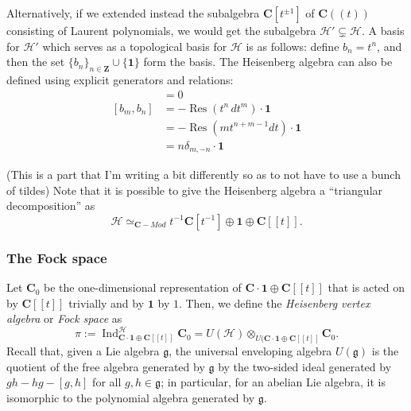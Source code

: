 \documentclass{article}
\newcommand{\CC}{\mathbold{C}}
\newcommand{\ZZ}{\mathbold{Z}}
\newcommand{\Hh}{\mathcal{H}}
\newcommand{\one}{\mathbold{1}}
\newcommand{\gf}{\mathfrak{g}}
\DeclareMathOperator{\Res}{Res}
\DeclareMathOperator{\Ind}{Ind}
\begin{document}
Alternatively, if we extended instead the subalgebra $\CC[t^{\pm 1}]$ of $\CC((t))$ consisting of Laurent polynomials, we would get the subalgebra $\Hh' \subsetneq \Hh$.  A basis for $\Hh'$ which serves as a topological basis for $\Hh$ is as follows: define $b_n=t^n$, and then the set $\{b_n\}_{n \in \ZZ} \cup \{\one\}$ form the basis.  The Heisenberg algebra can also be defined using explicit generators and relations:
\begin{align}
  [b_n,\one]&=0\\
  [b_m,b_n]&=-\Res(t^n\,dt^m)\cdot\one\\
  &=-\Res(mt^{n+m-1}dt)\cdot\one\\
  &=n\delta_{m,-n}\cdot\one
\end{align}

(This is a part that I'm writing a bit differently so as to not have to use a bunch of tildes)
Note that it is possible to give the Heisenberg algebra a ``triangular decomposition'' as 
\[\Hh \simeq_{\CC-Mod} t^{-1}\CC[t^{-1}] \oplus \one \oplus \CC[[t]].  \]

\subsubsection{The Fock space}
\label{sec:fockspace}

Let $\CC_0$ be the one-dimensional representation of $\CC \cdot\one \oplus \CC[[t]]$ that is acted on by $\CC[[t]]$ trivially and by $\one$ by $1$.  Then, we define the \textit{Heisenberg vertex algebra} or \textit{Fock space} as
\[\pi:=\Ind_{\CC \cdot \one \oplus \CC[[t]]}^\Hh\CC_0=U(\Hh) \otimes_{U(\CC \cdot \one \oplus \CC[[t]]}\CC_0. \]
Recall that, given a Lie algebra $\gf$, the universal enveloping algebra $U(\gf)$ is the quotient of the free algebra generated by $\gf$ by the two-sided ideal generated by $gh-hg-[g,h]$ for all $g,h \in \gf$; in particular, for an abelian Lie algebra, it is isomorphic to the polynomial algebra generated by $\gf$.
\end{document}
